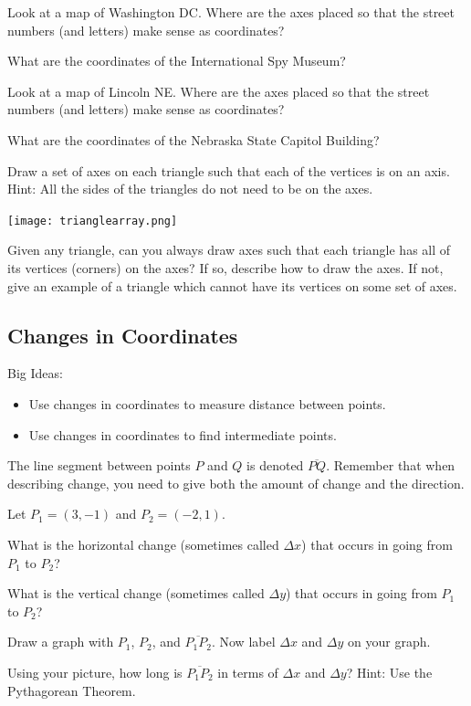 \bq\label{cq} \be
\item  Look at a map of Washington DC. Where are the axes placed so that the street numbers (and letters) make sense as coordinates?
\item What are the coordinates of the International Spy Museum?
\ee \eq

\bq \be
\item  Look at a map of Lincoln NE. Where are the axes placed so that the street numbers (and letters) make sense as coordinates?
\item What are the coordinates of the Nebraska State Capitol Building?
\ee \eq

\bq Draw a set of axes on each triangle such that each of the vertices is on an axis. Hint: All the sides of the triangles do not need to be on the axes.

\texttt{[image: trianglearray.png]}
\eq

\bq\label{q2} Given any triangle, can you always draw axes such that each triangle has all of its vertices (corners) on the axes? If so, describe how to draw the axes. If not, give an example of a triangle which cannot have its vertices on some set of axes.
\eq
\subsection{Changes in Coordinates}
Big Ideas:
\begin{itemize}
\item Use changes in coordinates to measure distance between points.
\item Use changes in coordinates to find intermediate points.
\end{itemize}
\begin{info} The line segment between points $P$ and $Q$ is denoted $\overline{PQ}$. Remember that when describing change, you need to give both the amount of change and the direction. \end{info}

\bq Let $P_1=(3,-1)$ and $P_2=(-2,1)$.
\be
\item What is the horizontal change (sometimes called $\Delta x$) that occurs in going from $P_1$ to $P_2$?
\item What is the vertical change (sometimes called $\Delta y$) that occurs in going from $P_1$ to $P_2$?
\item Draw a graph with $P_1$, $P_2$, and $\overline{P_1 P_2}$. Now label $\Delta x$ and $\Delta y$ on your graph.
\item Using your picture, how long is $\overline{P_1 P_2}$ in terms of $\Delta x$ and $\Delta y$? Hint: Use the Pythagorean Theorem.
\ee
\eq

